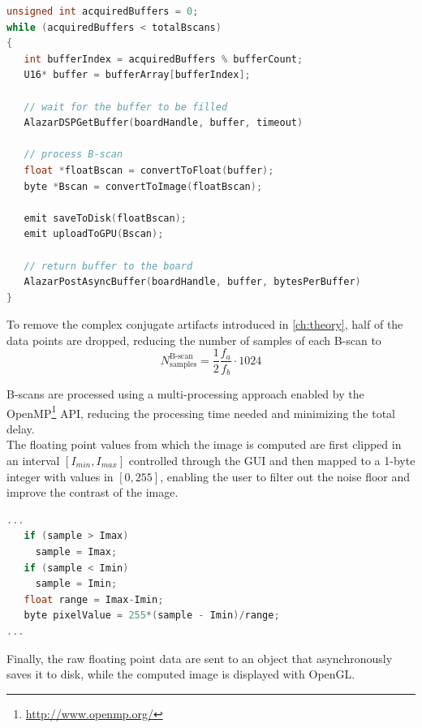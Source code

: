\begin{lstlisting}[language=C,frame=tb]
unsigned int acquiredBuffers = 0;
while (acquiredBuffers < totalBscans)
{
   int bufferIndex = acquiredBuffers % bufferCount;
   U16* buffer = bufferArray[bufferIndex];
	
   // wait for the buffer to be filled
   AlazarDSPGetBuffer(boardHandle, buffer, timeout)

   // process B-scan
   float *floatBscan = convertToFloat(buffer);
   byte *Bscan = convertToImage(floatBscan);
   
   emit saveToDisk(floatBscan);
   emit uploadToGPU(Bscan);
   
   // return buffer to the board
   AlazarPostAsyncBuffer(boardHandle, buffer, bytesPerBuffer)
}
\end{lstlisting}

To remove the complex conjugate artifacts introduced in \autoref{ch:theory}, half of the data points are dropped, reducing the number of samples of each B-scan to 
\begin{equation}
	N_{\text{samples}}^{\text{B-scan}} = \frac{1}{2} \frac{f_a}{f_b} \cdot 1024
\end{equation}

B-scans are processed using a multi-processing approach enabled by the OpenMP\footnote{\url{http://www.openmp.org/}} \ac{API}, reducing the processing time needed and minimizing the total delay. \\

The floating point values from which the image is computed are first clipped in an interval $[I_{min}, I_{max}]$ controlled through the \ac{GUI} and then mapped to a 1-byte integer with values in $[0, 255]$, enabling the user to filter out the noise floor and improve the contrast of the image. 
\begin{lstlisting}[language=C,frame=tb]
...
   if (sample > Imax)
     sample = Imax;
   if (sample < Imin)
     sample = Imin;
   float range = Imax-Imin;
   byte pixelValue = 255*(sample - Imin)/range;
...
\end{lstlisting}

Finally, the raw floating point data are sent to an object that asynchronously saves it to disk, while the computed image is displayed with OpenGL. 

